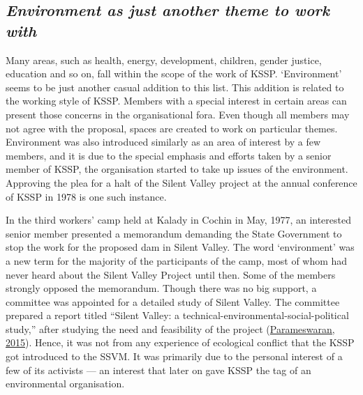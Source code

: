 \documentclass[twoside, 13pt]{article}
\begin{document}
{{{\vspace{-.2cm}

{\fontsize{8}{10}\selectfont\subsection*{\textit{Environment as just another theme to work with}}}

{\fontsize{12}{14}\selectfont Many areas, such as health, energy, development, children, gender justice, education and so on, fall within the scope of the work of KSSP. ‘Environment’ seems to be just another casual addition to this list. This addition is related to the working style of KSSP. Members with a special interest in certain areas can present those concerns in the organisational fora. Even though all members may not agree with the proposal, spaces are created to work on particular themes. Environment was also introduced similarly as an area of interest by a few members, and it is due to the special emphasis and efforts taken by a senior member of KSSP, the organisation started to take up issues of the environment. Approving the plea for a halt of the Silent Valley project at the annual conference of KSSP in 1978 is one such instance.

In the third workers’ camp held at Kalady in Cochin in May, 1977, an interested senior member presented a memorandum demanding the State Government to stop the work for the proposed dam in Silent Valley. The word ‘environment’ was a new term for the majority of the participants of the camp, most of whom had never heard about the Silent Valley Project until then. Some of the members strongly opposed the memorandum. Though there was no big support, a committee was appointed for a detailed study of Silent Valley. The committee prepared a report titled “Silent Valley: a technical-environmental-social-political study,” after studying the need and feasibility of the project (\underline{Parameswaran, 2015}). Hence, it was not from any experience of ecological conflict that the KSSP got introduced to the SSVM. It was primarily due to the personal interest of a few of its activists — an interest that later on gave KSSP the tag of an environmental organisation.}

\vspace{-.5cm}

}}}
\end{document}
